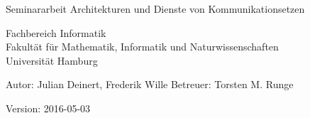 \documentclass[
    paper=A4,pagesize,  %
    ngerman,            %
    oneside,            %
    parskip=full*       %
]{scrartcl}
\begin{document}
\begin{titlepage}
    \vspace{75pt}
    \textbf{\Huge \metaTitle}

    \vspace{20pt}

    {\Large Seminararbeit Architekturen und Dienste von Kommunikationsetzen}


    \vspace{5pt}

    Fachbereich Informatik\\
    Fakultät für Mathematik, Informatik und Naturwissenschaften\\
    Universität Hamburg

    \vfill


    \vfill
    \Large
    Autor: Julian Deinert, Frederik Wille
    Betreuer: Torsten M. Runge

    Version: 2016-05-03
    \vspace{75pt}
\end{titlepage}

\tableofcontents





\clearpage
\nocite{*}
\printbibliography
\end{document}
